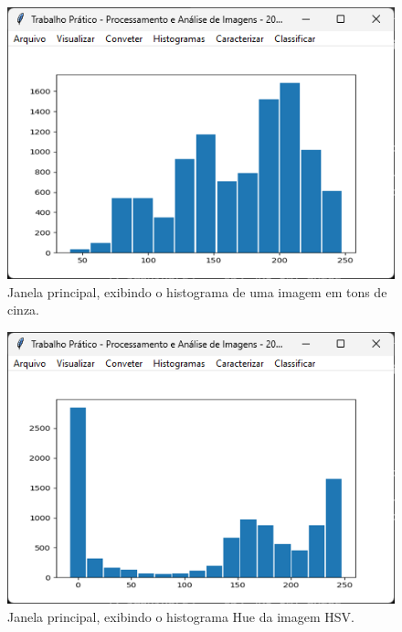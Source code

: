 \documentclass[12pt]{article}
\begin{document}
\begin{figure}
    \centering
    \includegraphics{Captura de tela 2024-06-10 094919.png}
    \caption{Janela principal, exibindo o histograma de uma imagem em tons de cinza.}
    \label{fig:janela-principal-histograma-tons-cinza}
\end{figure}

\begin{figure}
    \centering
    \includegraphics{Captura de tela 2024-06-10 094944.png}
    \caption{Janela principal, exibindo o histograma Hue da imagem HSV.}
    \label{fig:janela-principal-histograma-hue}
\end{figure}
\end{document}

